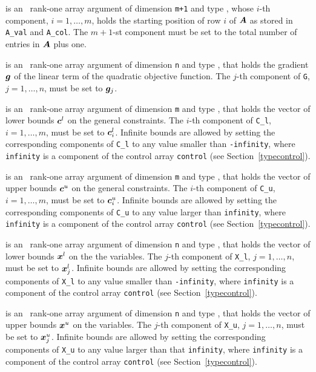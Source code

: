 \documentclass{galahad}
\begin{document}
\begin{description}
 is an \intentin\ rank-one array argument
of dimension {\tt m+1} and type \integer,
whose $i$-th component, $i = 1, \ldots , m$, holds the  starting position
of row $i$ of ${\bm{A}}$ as stored in {\tt A\_val} and {\tt A\_col}.
The $m+1$-st component must be set to the total number of entries
in ${\bm{A}}$ plus one.

 is an \intentin\ rank-one array argument of dimension {\tt n}
and type \realdp, that holds the gradient ${\bm{g}}$
of the linear term of the quadratic objective function.
The $j$-th component of {\tt G}, $j = 1,  \ldots ,  n$, must be set to
${\bm{g}}_{j}$.

 is an \intentin\ rank-one array argument of dimension {\tt m}
and type \realdp, that holds the vector of lower bounds ${\bm{c}}^{l}$
on the general constraints. The $i$-th component of
{\tt C\_l}, $i = 1, \ldots , m$, must be set to ${\bm{c}}_{i}^{l}$.
Infinite bounds are allowed by setting the corresponding
components of {\tt C\_l} to any value smaller than {\tt -infinity},
where {\tt infinity} is a component of the control array {\tt control}
(see Section~\ref{typecontrol}).

 is an \intentin\ rank-one array argument of dimension {\tt m}
and type \realdp, that holds the vector of upper bounds ${\bm{c}}^{u}$
on the general constraints. The $i$-th component of
{\tt C\_u}, $i = 1,  \ldots ,  m$, must be set to ${\bm{c}}_{i}^{u}$.
Infinite bounds are allowed by setting the corresponding
components of {\tt C\_u} to any value larger than {\tt infinity},
where {\tt infinity} is a component of the control array {\tt control}
(see Section~\ref{typecontrol}).

 is an \intentin\ rank-one array argument of dimension {\tt n}
and type \realdp, that holds
the vector of lower bounds ${\bm{x}}^{l}$ on the the variables.
The $j$-th component of {\tt X\_l}, $j = 1, \ldots , n$,
must be set to ${\bm{x}}_{j}^{l}$.
Infinite bounds are allowed by setting the corresponding
components of {\tt X\_l} to any value smaller than {\tt -infinity},
where {\tt infinity} is a component of the control array {\tt control}
(see Section~\ref{typecontrol}).

 is an \intentin\  rank-one array argument of dimension {\tt n}
and type \realdp, that holds
the vector of upper bounds ${\bm{x}}^{u}$ on the variables.
The $j$-th component of {\tt X\_u}, $j = 1, \ldots , n$,
must be set to ${\bm{x}}_{j}^{u}$.
Infinite bounds are allowed by setting the corresponding
components of {\tt X\_u} to any value larger than that {\tt infinity},
where {\tt infinity} is a component of the control array {\tt control}
(see Section~\ref{typecontrol}).


\end{description}
\end{document}
